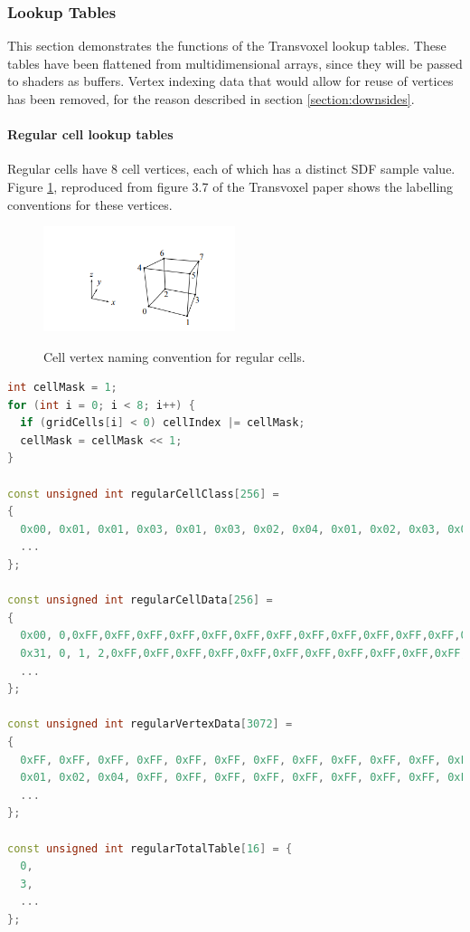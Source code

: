 \documentclass[11pt]{article}
\begin{document}
\subsubsection{Lookup Tables}
\label{section:lookup_tables}

This section demonstrates the functions of the Transvoxel lookup tables. These tables have been flattened from multidimensional arrays, since they will be passed to shaders as buffers. Vertex indexing data that would allow for reuse of vertices has been removed, for the reason described in section \ref{section:downsides}.

\paragraph{Regular cell lookup tables}
Regular cells have 8 cell vertices, each of which has a distinct SDF sample value. Figure \ref{fig:tv_labels}, reproduced from figure 3.7 of the Transvoxel paper\cite{lengyel_2010} shows the labelling conventions for these vertices.

\begin{figure}
  \caption{Cell vertex naming convention for regular cells.}
  \includegraphics[width=0.5\textwidth]{tv_labels.PNG}
  \label{fig:tv_labels}
\end{figure}

\begin{lstlisting}[language=C++,label={tv_tables},caption={Calculation of \texttt{cellIndex}, and lookup tables, for regular cells. An example of their usage is given below.}]
int cellMask = 1;
for (int i = 0; i < 8; i++) {
  if (gridCells[i] < 0) cellIndex |= cellMask;
  cellMask = cellMask << 1;
}

const unsigned int regularCellClass[256] =
{
  0x00, 0x01, 0x01, 0x03, 0x01, 0x03, 0x02, 0x04, 0x01, 0x02, 0x03, 0x04, 0x03, 0x04, 0x04, 0x03,
  ...
};

const unsigned int regularCellData[256] =
{
  0x00, 0,0xFF,0xFF,0xFF,0xFF,0xFF,0xFF,0xFF,0xFF,0xFF,0xFF,0xFF,0xFF,0xFF,0xFF,
  0x31, 0, 1, 2,0xFF,0xFF,0xFF,0xFF,0xFF,0xFF,0xFF,0xFF,0xFF,0xFF,0xFF,0xFF,
  ...
};

const unsigned int regularVertexData[3072] =
{
  0xFF, 0xFF, 0xFF, 0xFF, 0xFF, 0xFF, 0xFF, 0xFF, 0xFF, 0xFF, 0xFF, 0xFF,
  0x01, 0x02, 0x04, 0xFF, 0xFF, 0xFF, 0xFF, 0xFF, 0xFF, 0xFF, 0xFF, 0xFF,
  ...
};

const unsigned int regularTotalTable[16] = {
  0,
  3,
  ...
};
\end{lstlisting}
\end{document}

